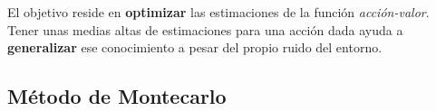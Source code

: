 \documentclass[11pt,fleqn]{book} %
\begin{document}
%
%	
%	

El objetivo reside en \textbf{optimizar} las estimaciones de la función \textit{acción-valor}. Tener unas medias altas de estimaciones para una acción dada ayuda a \textbf{generalizar} ese conocimiento a pesar del propio ruido del entorno.

\subsection{Método de Montecarlo}

\end{document}
